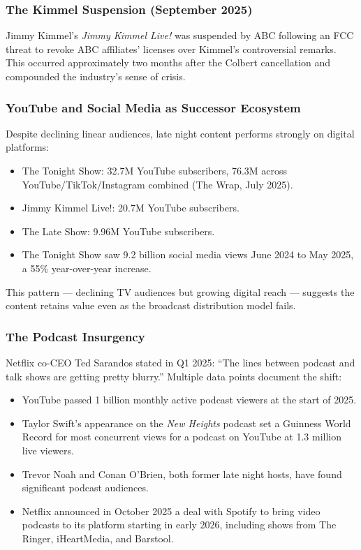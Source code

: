\documentclass[11pt,letterpaper]{article}
\begin{document}
\subsubsection{The Kimmel Suspension (September 2025)}
Jimmy Kimmel's \textit{Jimmy Kimmel Live!} was suspended by ABC following an FCC threat to revoke ABC affiliates' licenses over Kimmel's controversial remarks. This occurred approximately two months after the Colbert cancellation and compounded the industry's sense of crisis.

\subsubsection{YouTube and Social Media as Successor Ecosystem}
Despite declining linear audiences, late night content performs strongly on digital platforms:
\begin{itemize}[leftmargin=1.5em]
  \item The Tonight Show: 32.7M YouTube subscribers, 76.3M across YouTube/TikTok/Instagram combined (The Wrap, July 2025).
  \item Jimmy Kimmel Live!: 20.7M YouTube subscribers.
  \item The Late Show: 9.96M YouTube subscribers.
  \item The Tonight Show saw 9.2 billion social media views June 2024 to May 2025, a 55\% year-over-year increase.
\end{itemize}
This pattern --- declining TV audiences but growing digital reach --- suggests the content retains value even as the broadcast distribution model fails.

\subsubsection{The Podcast Insurgency}
Netflix co-CEO Ted Sarandos stated in Q1 2025: ``The lines between podcast and talk shows are getting pretty blurry.'' Multiple data points document the shift:
\begin{itemize}[leftmargin=1.5em]
  \item YouTube passed 1 billion monthly active podcast viewers at the start of 2025.
  \item Taylor Swift's appearance on the \textit{New Heights} podcast set a Guinness World Record for most concurrent views for a podcast on YouTube at 1.3 million live viewers.
  \item Trevor Noah and Conan O'Brien, both former late night hosts, have found significant podcast audiences.
  \item Netflix announced in October 2025 a deal with Spotify to bring video podcasts to its platform starting in early 2026, including shows from The Ringer, iHeartMedia, and Barstool.
\end{itemize}
\end{document}
